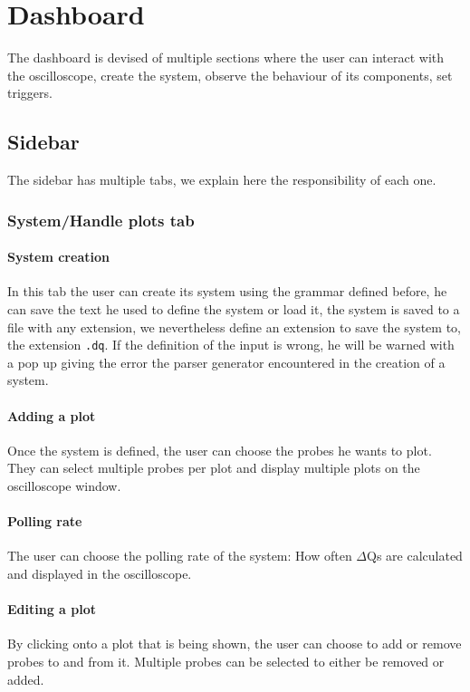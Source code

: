 \section{Dashboard}
    The dashboard is devised of multiple sections where the user can interact with the oscilloscope, create the system, observe the behaviour of its components, set triggers.

    \subsection{Sidebar}
        The sidebar has multiple tabs, we explain here the responsibility of each one.

    \subsubsection{System/Handle plots tab}

    \paragraph{System creation}
        In this tab the user can create its system using the grammar defined before, he can save the text he used to define the system or load it, the system is saved to a file with any extension, we nevertheless define an extension to save the system to, the extension \texttt{.dq}.
        If the definition of the input is wrong, he will be warned with a pop up giving the error the parser generator encountered in the creation of a system.

    \paragraph{Adding a plot}
        Once the system is defined, the user can choose the probes he wants to plot. They can select multiple probes per plot and display multiple plots on the oscilloscope window.
    
    \paragraph{Polling rate}
        The user can choose the polling rate of the system: How often $\Delta$Qs are calculated and displayed in the oscilloscope.

    \paragraph{Editing a plot}
        By clicking onto a plot that is being shown, the user can choose to add or remove probes to and from it. Multiple probes can be selected to either be removed or added.

